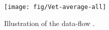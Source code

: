 \begin{figure}[!ht]
\begin{center}
\texttt{[image: fig/Vet-average-all]}
\caption{Illustration of the data-flow \IG.}\label{fig:average}
\end{center}
\end{figure}
